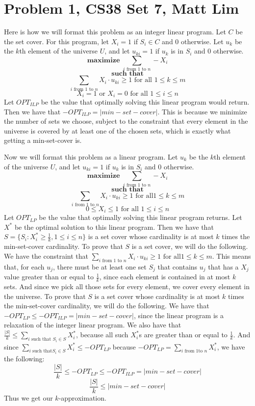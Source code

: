 \documentclass{article}
\begin{document}
\section*{Problem 1, CS38 Set 7, Matt Lim}
Here is how we will format this problem as an integer linear program. Let $C$ be
the set cover. For this
program, let $X_i = 1$ if $S_i \in C$ and $0$ otherwise. Let $u_k$ be the $k$th
element of the universe $U$, and let $u_{ki} = 1$
if $u_k$ is in $S_i$ and $0$ otherwise.
\[ \textbf{maximize } \sum_{i \text{ from $1$ to $n$}} -X_i \]
\[ \textbf{such that} \]
\[ \sum_{i \text{ from $1$ to $n$}} X_i \cdot u_{ki} \geq 1 \text{ for all $1
\leq k \leq m$} \]
\[ X_i = 1 \text{ or } X_i = 0 \text{ for all $1 \leq i \leq n$} \]
Let $OPT_{ILP}$ be the value that optimally solving this linear program would return. Then
we have that $-OPT_{ILP} = |min-set-cover|$. This is because we minimize the
number of sets we choose, subject to the constraint that every element in the
universe is covered by at least one of the chosen sets, which is exactly what getting a
min-set-cover is.

Now we will format this problem as a linear program. Let $u_k$ be the $k$th
element of the universe $U$, and let $u_{ki} = 1$
if $u_k$ is in $S_i$ and $0$ otherwise.
\[ \textbf{maximize } \sum_{i \text{ from $1$ to $n$}} -X_i \]
\[ \textbf{such that} \]
\[ \sum_{i \text{ from $1$ to $n$}} X_i \cdot u_{ki} \geq 1 \text{ for all
$1 \leq k \leq m$} \]
\[ 0 \leq X_i \leq 1 \text{ for all $1 \leq i \leq n$} \]
Let $OPT_{LP}$ be the value that optimally solving this linear program returns. Let $X^*$
be the optimal solution to this linear program. Then we have that
$S = \{S_i : X_i^* \geq \frac{1}{k}, 1 \leq i \leq n\}$ is a set cover whose cardinality
is at most $k$ times the min-set-cover cardinality. To prove that $S$ is a set
cover, we will do the following. We have the constraint that
$\sum_{i \text{ from $1$ to $n$}} X_i \cdot u_{ki} \geq 1 \text{ for all
$1 \leq k \leq m$}$. This means that, for each $u_j$, there must be at least one set
$S_j$ that contains $u_j$ that has a $X_j$ value greater than or equal to
$\frac{1}{k}$, since each element is contained in at most $k$ sets.
And since we pick all those sets for every element, we cover every element in the
universe. To prove that $S$ is a set cover whose cardinality is at most $k$
times the min-set-cover cardinality, we will do the following. We have that
$-OPT_{LP} \leq -OPT_{ILP} = |min-set-cover|$, since the linear program is a
relaxation of the integer linear program. We also have that $\frac{|S|}{k}
\leq \sum_{i \text{ such that $S_i \in S$}} X^*_i$, because all such $X^*_i$s
are greater than or equal to $\frac{1}{k}$. And since $\sum_{i \text{ such that
$S_i \in S$}} X^*_i \leq -OPT_{LP}$ because $-OPT_{LP} = \sum_{i \text{ from $1$
to $n$}} X^*_i$, we have the following:
\[ \frac{|S|}{k} \leq -OPT_{LP} \leq -OPT_{ILP} = |min-set-cover| \]
\[ \frac{|S|}{k} \leq |min-set-cover| \]
Thus we get our $k$-approximation.
\newpage
\end{document}
